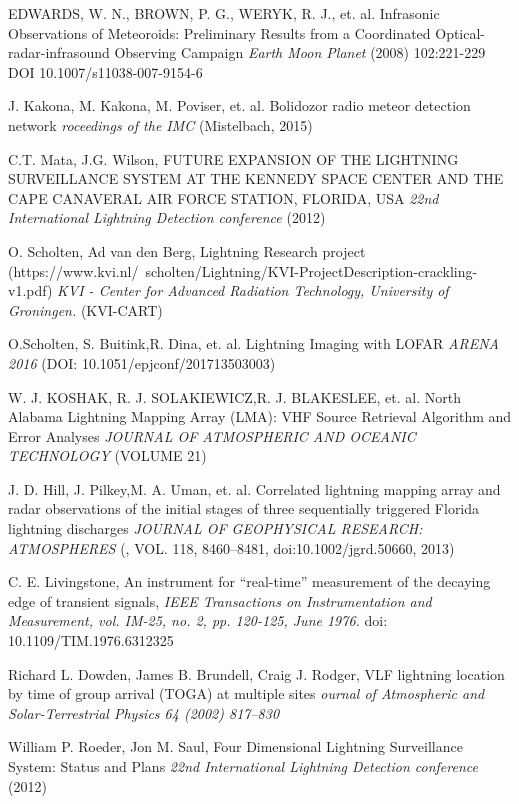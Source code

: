 \documentclass[twoside]{ctuthesis}
\theoremstyle{plain}
\theoremstyle{definition}
\theoremstyle{note}
\begin{document}
\begin{thebibliography}{99}
EDWARDS, W. N., BROWN, P. G., WERYK, R. J., et. al.
Infrasonic Observations of Meteoroids: Preliminary Results from a Coordinated Optical-radar-infrasound Observing Campaign
\emph{Earth Moon Planet} (2008) 102:221-229
DOI 10.1007/s11038-007-9154-6

J. Kakona, M. Kakona, M. Poviser, et. al.
Bolidozor radio meteor detection network
\emph{roceedings of the IMC} (Mistelbach, 2015)

C.T. Mata, J.G. Wilson,
FUTURE EXPANSION OF THE LIGHTNING SURVEILLANCE SYSTEM AT THE KENNEDY SPACE CENTER AND THE CAPE CANAVERAL AIR FORCE STATION, FLORIDA, USA  
\emph{22nd International Lightning Detection conference} (2012) 

O. Scholten, Ad van den Berg,
Lightning Research project (https://www.kvi.nl/~scholten/Lightning/KVI-ProjectDescription-crackling-v1.pdf)
\emph{KVI - Center for Advanced Radiation Technology, University of Groningen.} (KVI-CART) 

O.Scholten, S. Buitink,R. Dina, et. al.
Lightning Imaging with LOFAR
\emph{ARENA 2016} (DOI: 10.1051/epjconf/201713503003) 

W. J. KOSHAK, R. J. SOLAKIEWICZ,R. J. BLAKESLEE, et. al.
North Alabama Lightning Mapping Array (LMA): VHF Source Retrieval Algorithm
and Error Analyses
\emph{JOURNAL OF ATMOSPHERIC AND OCEANIC TECHNOLOGY} (VOLUME 21) 

J. D. Hill, J. Pilkey,M. A. Uman, et. al.
Correlated lightning mapping array and radar observations of the initial stages of three sequentially triggered Florida lightning discharges
\emph{JOURNAL OF GEOPHYSICAL RESEARCH: ATMOSPHERES} (, VOL. 118, 8460–8481, doi:10.1002/jgrd.50660, 2013) 

C. E. Livingstone,
An instrument for “real-time” measurement of the decaying edge of transient signals,
\emph{IEEE Transactions on Instrumentation and Measurement, vol. IM-25, no. 2, pp. 120-125, June 1976.} doi: 10.1109/TIM.1976.6312325

Richard L. Dowden,  James B. Brundell, Craig J. Rodger, 
VLF lightning location by time of group arrival (TOGA) at multiple sites
\emph{ournal of Atmospheric and Solar-Terrestrial Physics 64 (2002) 817–830}


William P. Roeder, Jon M. Saul,
Four Dimensional Lightning Surveillance System:  Status and Plans  
\emph{22nd International Lightning Detection conference} (2012)


\end{thebibliography}
\end{document}
